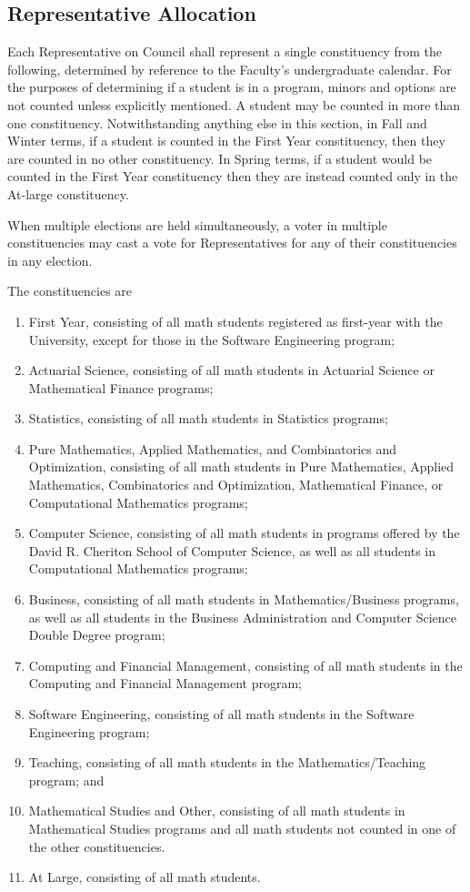 \subsection{Representative Allocation}
Each Representative on Council shall represent a single constituency from the
following, determined by reference to the Faculty's undergraduate calendar. For
the purposes of determining if a student is in a program, minors and options are
not counted unless explicitly mentioned. A student may be
counted in more than one constituency. Notwithstanding anything else in this
section, in Fall and Winter terms, if a student is counted in the First Year constituency, 
then they are counted in no other constituency. In Spring terms, if a student would be counted in the First Year constituency then they are instead counted only in the At-large constituency.

When multiple elections are held simultaneously, a voter in multiple
constituencies may cast a vote for Representatives for any of their constituencies in
any election.

The constituencies are
\begin{enumerate}
  \item First Year, consisting of all math students registered as first-year
    with the University, except for those in the Software Engineering program;
  \item Actuarial Science, consisting of all math students in Actuarial Science
    or Mathematical Finance programs;
  \item Statistics, consisting of all math students in Statistics programs;
  \item Pure Mathematics, Applied Mathematics, and Combinatorics and
    Optimization, consisting of all math students in Pure Mathematics, Applied
    Mathematics, Combinatorics and Optimization, Mathematical Finance, or
    Computational Mathematics programs;
  \item Computer Science, consisting of all math students in programs offered by
    the David R. Cheriton School of Computer Science, as well as all students in
    Computational Mathematics programs;
  \item Business, consisting of all math students in Mathematics/Business
    programs, as well as all students in the Business Administration and
    Computer Science Double Degree program;
  \item Computing and Financial Management, consisting of all math students in
    the Computing and Financial Management program;
  \item Software Engineering, consisting of all math students in the Software
    Engineering program;
  \item Teaching, consisting of all math students in the
    Mathematics/Teaching program;
    and
  \item Mathematical Studies and Other, consisting of all math students in
    Mathematical Studies programs and all math students not counted in one of
    the other constituencies.
  \item At Large, consisting of all math students.  
\end{enumerate}


